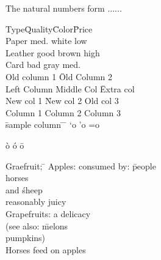 \documentclass[12pt,twoside,a4paper]{article}   %
\begin{document}
	\begin{axiom}
		The natural numbers form ......
	\end{axiom} 
	\begin{tabbing}
		Type\qquad\= Quality\quad\=
		Color\quad\= Price\\[0.8ex]
		Paper \> med. \>white \> low \\
		Leather \> good \> brown \> high\\
		Card	\> bad \> gray \> med.\\
		Old column 1 \= Old Column 2\\
		Left Column \> Middle Col
		\= Extra col\\
		New col 1 \= New col 2 \>
		Old col 3\\
		Column 1 \> Column 2 \> Column 3\\
		\hspace*{3cm} \=sample column \= \hspace{4cm} \= \kill
		\a`o \a'o \a=o
	\end{tabbing}
	\`o \'o \=o
	\begin{tabbing}
		Graefruit; \= \kill
		Apples: \> consumed by: \=people\+\+\\
		horses \nd \' sheep\-\\
		reasonably juicy\-\\
		Grapefruits: \> a delicacy\\
		\pushtabs
		(see also: \= melons\\
		\> pumpkins)\\
		\poptabs
		Horses \> feed on \>apples
	\end{tabbing}
	\newpage
	\\
	\\
	\\
	\\
\end{document}
